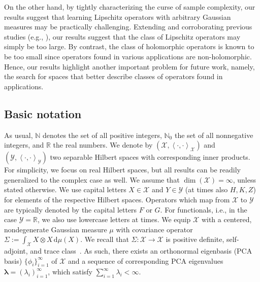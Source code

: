 \documentclass[namedate,webpdf]{ima-authoring-template-blank}
\def\D{\,\mathrm{d}}
\newcommand*{\ip}[2]{\left\langle #1, #2 \right\rangle}
\numberwithin{counter}{section}
\numberwithin{equation}{section}
\theoremstyle{plain}
\theoremstyle{definition}
\newcommand*{\cX}{\mathcal{X}}
\newcommand*{\cY}{\mathcal{Y}}
\newcommand*{\bbN}{\mathbb{N}}
\newcommand*{\bbR}{\mathbb{R}}
\theoremstyle{thmstyletwo}
\begin{document}
On the other hand, by tightly characterizing the curse of sample complexity, our results suggest that learning Lipschitz operators with arbitrary Gaussian measures may be practically challenging.
Extending and corroborating previous studies (e.g., \citet{kovachki_DataComplexityEstimatesOperator_2024, lanthaler_ParametricComplexityOperatorLearning_2026}), our results suggest that the class of Lipschitz operators may simply be too large. By contrast, the class of holomorphic operators is known to be too small since operators found in various applications are non-holomorphic. Hence, our results highlight another important problem for future work, namely, the search for spaces that better describe classes of operators found in applications.



\subsection{Basic notation}
\label{subsec: notation}

As usual, \(\bbN\) denotes the set of all positive integers, \(\bbN_0\) the set of all nonnegative integers, and \(\bbR\) the real numbers.
We denote by \((\cX, \ip{\cdot}{\cdot}_{\cX})\) and \((\cY, \ip{\cdot}{\cdot}_{\cY})\) two separable Hilbert spaces with corresponding inner products. For simplicity, we focus on real Hilbert spaces, but all results can be readily generalized to the complex case as well. We assume that \(\dim(\cX) = \infty\), unless stated otherwise. We use capital letters \(X \in \cX\) and \(Y \in \cY\) (at times also \(H, K, Z\))  for elements of the respective Hilbert spaces. Operators which map from \(\cX\) to \(\cY\) are typically denoted by the capital letters \(F\) or \(G\). For functionals, i.e., in the case \(\cY = \bbR\), we also use lowercase letters at times.
We equip \(\cX\) with a centered, nondegenerate Gaussian measure \(\mu\) with covariance operator \(\Sigma := \int_{\cX}{X \otimes X \D \mu(X)}\). We recall that \(\Sigma: \cX\to \cX\) is positive definite, self-adjoint, and trace class~\citep[Prop. 1.8]{daprato_IntroductionInfiniteDimensionalAnalysis_2006}. As such, there exists an orthonormal eigenbasis (PCA basis) \(\{\phi_i\}_{i = 1}^{\infty}\) of \(\cX\) and a sequence of corresponding PCA eigenvalues \(\bm{\lambda} = (\lambda_i)_{i = 1}^{\infty}\), which satisfy \( \sum_{i = 1}^{\infty} \lambda_i < \infty \).






\end{document}
